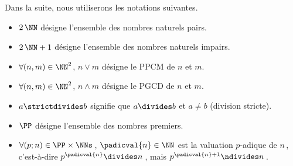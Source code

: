 Dans la suite, nous utiliserons les notations suivantes.
\begin{itemize}
	\item $2\,\NN$ désigne l'ensemble des nombres naturels pairs.
	
	\item $2\,\NN + 1$ désigne l'ensemble des nombres naturels impairs.
	
	\item $\forall (n , m) \in \NN^2$, $n \vee m$ désigne le PPCM de $n$ et $m$.

	\item $\forall (n , m) \in \NN^2$, $n \wedge m$ désigne le PGCD de $n$ et $m$.

	\item $a \strictdivides b$ signifie que $a \divides b$ et $a \neq b$ (division stricte).

	\item $\PP$ désigne l'ensemble des nombres premiers.
	
	\item $\forall (p ; n) \in \PP \times \NNs$\,, $\padicval{n} \in \NN$ est la valuation $p$-adique de $n$\,, c'est-à-dire $p^{\padicval{n}} \divides n$\,, mais $p^{\padicval{n} + 1} \ndivides n$\,.
\end{itemize}